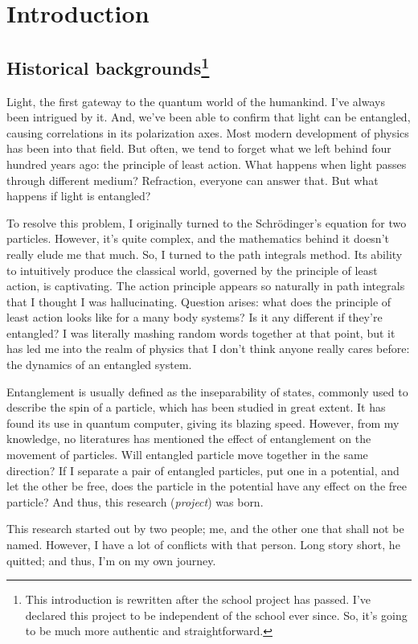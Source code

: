 \chapter{Introduction}

\section[Historical backgrounds]{Historical backgrounds\footnote{This introduction is rewritten after the school project has passed. I've declared this project to be independent of the school ever since. So, it's going to be much more authentic and straightforward.}}

Light, the first gateway to the quantum world of the humankind. I've always been intrigued by it. And, we've been able to confirm that light can be entangled, causing correlations in its polarization axes. Most modern development of physics has been into that field. But often, we tend to forget what we left behind four hundred years ago: the principle of least action. What happens when light passes through different medium? Refraction, everyone can answer that. But what happens if light is entangled?

To resolve this problem, I originally turned to the Schr\"odinger's equation for two particles. However, it's quite complex, and the mathematics behind it doesn't really elude me that much. So, I turned to the path integrals method. Its ability to intuitively produce the classical world, governed by the principle of least action, is captivating. The action principle appears so naturally in path integrals that I thought I was hallucinating. Question arises: what does the principle of least action looks like for a many body systems? Is it any different if they're entangled? I was literally mashing random words together at that point, but it has led me into the realm of physics that I don't think anyone really cares before: the dynamics of an entangled system.

Entanglement is usually defined as the inseparability of states, commonly used to describe the spin of a particle, which has been studied in great extent. It has found its use in quantum computer, giving its blazing speed. However, from my knowledge, no literatures has mentioned the effect of entanglement on the movement of particles. Will entangled particle move together in the same direction? If I separate a pair of entangled particles, put one in a potential, and let the other be free, does the particle in the potential have any effect on the free particle? And thus, this research (\emph{project}) was born.

This research started out by two people; me, and the other one that shall not be named. However, I have a lot of conflicts with that person. Long story short, he quitted; and thus, I'm on my own journey.

\printunsrtglossary[type = symbols, style = longright, title = {List of Symbols (Still incomplete)}]